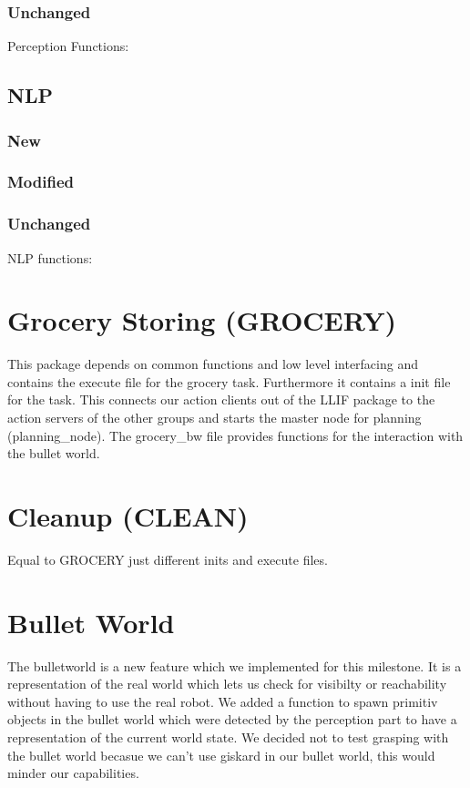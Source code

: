 \documentclass[main.tex]{subfiles}
\begin{document}
                \subsubsection{Unchanged}Perception Functions:
                
                \subsection{NLP}
                \subsubsection{New}
                \subsubsection{Modified}
                \subsubsection{Unchanged}NLP functions:
                
                \section{Grocery Storing (GROCERY)}
                This package depends on common functions and low level interfacing and contains the execute file for the grocery task. Furthermore it contains a init file for the task. This connects our action clients out of the LLIF package to the action servers of the other groups and starts the master node for planning (planning\_node). The grocery\_bw file provides functions for the interaction with the bullet world.   
                \section{Cleanup (CLEAN)}
                Equal to GROCERY just different inits and execute files.
                \section{Bullet World}
                The bulletworld is a new feature which we implemented for this milestone. It is a representation of the real world which lets us check for visibilty or reachability without having to use the real robot. We added a function to spawn primitiv objects in the bullet world which were detected by the perception part to have a representation of the current world state. We decided not to test grasping with the bullet world becasue we can't use giskard in our bullet world, this would minder our capabilities.
                
\end{document}
